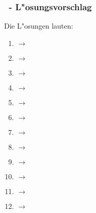 \begin{frame}[fragile]%
  \frametitle{\stitle\ - L"osungsvorschlag}%


Die L"osungen lauten:

\begin{center}

\begin{minipage}{0.3\textwidth}
\begin{enumerate}
\item {} $\rightarrow$ \\
\item {}     $\rightarrow$ \\
\item{}       $\rightarrow$ \\
\item {}      $\rightarrow$ \\
\end{enumerate}
\end{minipage}
\hfill
\begin{minipage}{0.3\textwidth}
\begin{enumerate}
\setcounter{enumi}{4}
\item {}   $\rightarrow$ \\
\item {}   $\rightarrow$ \\
\item {}$\rightarrow$ \\
\item {}  $\rightarrow$ \\
\end{enumerate}
\end{minipage}
\hfill
\begin{minipage}{0.3\textwidth}
\begin{enumerate}
\setcounter{enumi}{8}
\item {} $\rightarrow$ \\
\item {} $\rightarrow$ \\
\item {}  $\rightarrow$ \\
\item {}   $\rightarrow$ \\
\end{enumerate}
\end{minipage}

\end{center}
\end{frame}


%
%
